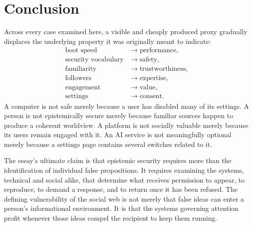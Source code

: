 \documentclass[11pt]{article}
\begin{document}
\section{Conclusion}

Across every case examined here, a visible and cheaply produced proxy gradually displaces the underlying property it was originally meant to indicate:
\[
\begin{aligned}
\text{boot speed} &\rightarrow \text{performance},\\
\text{security vocabulary} &\rightarrow \text{safety},\\
\text{familiarity} &\rightarrow \text{trustworthiness},\\
\text{followers} &\rightarrow \text{expertise},\\
\text{engagement} &\rightarrow \text{value},\\
\text{settings} &\rightarrow \text{consent}.
\end{aligned}
\]
A computer is not safe merely because a user has disabled many of its settings. A person is not epistemically secure merely because familiar sources happen to produce a coherent worldview. A platform is not socially valuable merely because its users remain engaged with it. An AI service is not meaningfully optional merely because a settings page contains several switches related to it.

The essay's ultimate claim is that epistemic security requires more than the identification of individual false propositions. It requires examining the systems, technical and social alike, that determine what receives permission to appear, to reproduce, to demand a response, and to return once it has been refused. The defining vulnerability of the social web is not merely that false ideas can enter a person's informational environment. It is that the systems governing attention profit whenever those ideas compel the recipient to keep them running.
\end{document}

